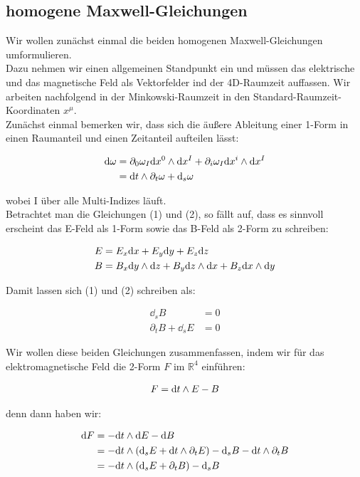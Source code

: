 \subsection{homogene Maxwell-Gleichungen}
Wir wollen zunächst einmal die beiden homogenen Maxwell-Gleichungen umformulieren. \\
Dazu nehmen wir einen allgemeinen Standpunkt ein und müssen das elektrische und das magnetische Feld als Vektorfelder ind der 4D-Raumzeit auffassen. Wir arbeiten nachfolgend in der Minkowski-Raumzeit in den Standard-Raumzeit-Koordinaten $x^{\mu}$. \\
Zunächst einmal bemerken wir, dass sich die äußere Ableitung einer 1-Form in einen Raumanteil und einen Zeitanteil aufteilen lässt:

\begin{align}
\dd \omega &= \partial_0 \omega_I \dd x^0 \wedge \dd x^{I} + \partial_i \omega_I \dd x^i \wedge \dd x^{I} \\
&= \dd t \wedge \partial_t \omega + \dd_s \omega 
\end{align}

wobei I über alle Multi-Indizes läuft. \\
Betrachtet man die Gleichungen (1) und (2), so fällt auf, dass es sinnvoll erscheint das E-Feld als 1-Form sowie das B-Feld als 2-Form zu schreiben:

\begin{align}
E &= E_x \dd x +E_y \dd y + E_z \dd z   \\
B &= B_x \dd y \wedge \dd z + B_y \dd z \wedge \dd x + B_z \dd x \wedge \dd y 
\end{align}

Damit lassen sich (1) und (2) schreiben als:

\begin{align}
\dd_s B &= 0 \\
\partial_t B + \dd_s E &=0
\end{align}

Wir wollen diese beiden Gleichungen zusammenfassen, indem wir für das elektromagnetische Feld die 2-Form $F$ im $\mathbb{R}^4$ einführen:

\begin{align}  
F= \dd t \wedge E -B 
\end{align} 

denn dann haben wir:

\begin{align}
\dd F &= - \dd t \wedge \dd E - \dd B \notag \\
		&= - \dd t \wedge (\dd_s E + \dd t \wedge \partial_t E ) - \dd_s B - \dd t \wedge \partial_t B \notag \\
		&= -\dd t \wedge (\dd_s E + \partial_t B) - \dd_s B
\end{align}

